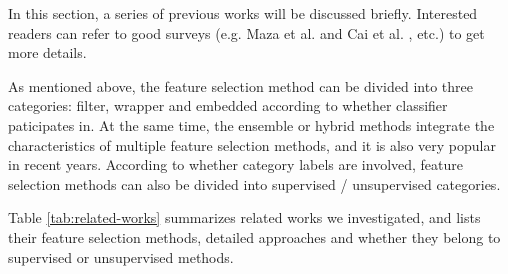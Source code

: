 \documentclass{ieeeaccess}
\theoremstyle{definition}
\begin{document}
In this section, a series of previous works will be discussed briefly. Interested readers can refer to good surveys (e.g. Maza et al. \cite{Maza2018} and Cai et al. \cite{Cai2018}, etc.) to get more details.

As mentioned above, the feature selection method can be divided into three categories: filter, wrapper and embedded according to whether classifier paticipates in. 
At the same time, the ensemble or hybrid methods integrate the characteristics of multiple feature selection methods, and it is also very popular in recent years. 
According to whether category labels are involved, feature selection methods can also be divided into supervised / unsupervised categories.

Table \ref{tab:related-works} summarizes related works we investigated, and lists their feature selection methods, detailed approaches and whether they belong to supervised or unsupervised methods.
\end{document}
